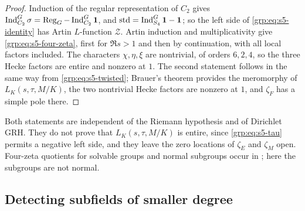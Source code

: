 \begin{proof}
Induction of the regular representation of $C_2$ gives
$\operatorname{Ind}_{C_2}^G\sigma=\operatorname{Reg}_G-\operatorname{Ind}_{C_2}^G\mathbf{1}$, and
$\mathrm{std}=\operatorname{Ind}_{S_4}^G\mathbf{1}-\mathbf{1}$; so the left side of
\eqref{grp:eq:s5-identity} has Artin $L$-function $\mathcal Z$. Artin
induction and multiplicativity give \eqref{grp:eq:s5-four-zeta}, first for
$\Re s>1$ and then by continuation, with all local factors included. The
characters $\chi,\eta,\xi$ are nontrivial, of orders $6,2,4$, so the three
Hecke factors are entire and nonzero at $1$. The second statement follows in
the same way from \eqref{grp:eq:s5-twisted}; Brauer's theorem provides the
meromorphy of $L_K(s,\tau,M/K)$, the two nontrivial Hecke factors are nonzero
at $1$, and $\zeta_F$ has a simple pole there.
\end{proof}

Both statements are independent of the Riemann hypothesis and of Dirichlet
GRH. They do not prove that $L_K(s,\tau,M/K)$ is entire, since
\eqref{grp:eq:s5-tau} permits a negative left side, and they leave the zero
locations of $\zeta_E$ and $\zeta_M$ open. Four-zeta quotients for solvable
groups and normal subgroups occur in \cite{GunHazraSahu2025Holomorphy}; here
the subgroups are not normal.


\subsection{Detecting subfields of smaller degree}\label{nab:sec:lowdegree}
\begingroup\raggedright
{}
\endgroup

